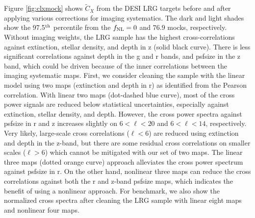 Figure \ref{fig:clxmock} shows $\tilde{C}_{X}$ from the DESI LRG targets before and after applying various corrections for imaging systematics. The dark and light shades show the 97.5$^{\rm th}$ percentile from the $f_{\rm NL}=0$ and $76.9$ mocks, respectively. Without imaging weights, the LRG sample has the highest cross-correlations against extinction, stellar density, and depth in z (solid black curve). There is less significant correlations against depth in the g and r bands, and psfsize in the z band, which could be driven because of the inner correlations between the imaging systematic maps. First, we consider cleaning the sample with the linear model using two maps (extinction and depth in r) as identified from the Pearson correlation. With linear two maps (dot-dashed blue curve), most of the cross power signals are reduced below statistical uncertainties, especially against extinction, stellar density, and depth. However, the cross power spectra against psfsize in r and z increases slightly on $6<\ell<20$ and $6<\ell<14$, respectively. Very likely, large-scale cross correlations ($\ell < 6$) are reduced using extinction and depth in the z-band, but there are some residual cross correlations on smaller scales ($\ell > 6$) which cannot be mitigated with our set of two maps. The linear three maps (dotted orange curve) approach alleviates the cross power spectrum against psfsize in r. On the other hand, nonlinear three maps can reduce the cross correlations against both the r and z-band psfsize maps, which indicates the benefit of using a nonlinear approach. For benchmark, we also show the normalized cross spectra after cleaning the LRG sample with linear eight maps and nonlinear four maps. 

